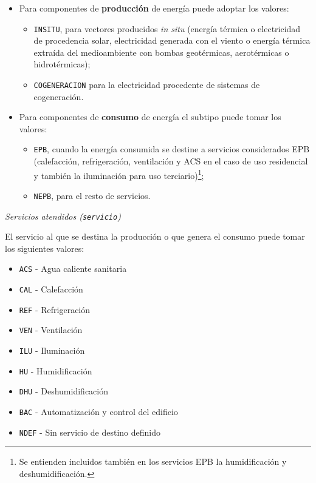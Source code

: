 \documentclass[10pt,notitlepage,oneside,a4paper]{article}
\begin{document}
\begin{itemize}
\item Para componentes de \textbf{producción} de energía puede adoptar los valores:
\begin{itemize}
\item \texttt{INSITU}, para vectores producidos \textit{in situ} (energía térmica o electricidad de procedencia solar, electricidad generada con el viento o energía térmica extraída del medioambiente con bombas geotérmicas, aerotérmicas o hidrotérmicas);
\item \texttt{COGENERACION} para la electricidad procedente de sistemas de cogeneración.
\end{itemize} 

\item Para componentes de \textbf{consumo} de energía el subtipo puede tomar los valores:

\begin{itemize}
\item \texttt{EPB}, cuando la energía consumida se destine a servicios considerados EPB (calefacción, refrigeración, ventilación y ACS en el caso de uso residencial y también la iluminación para uso terciario)\footnote{Se entienden incluidos también en los servicios EPB la humidificación y deshumidificación.};
\item \texttt{NEPB}, para el resto de servicios.
\end{itemize}

\end{itemize}

\textit{Servicios atendidos (\texttt{servicio})}

El servicio al que se destina la producción o que genera el consumo puede tomar los siguientes valores:

\begin{itemize}
\item \texttt{ACS} - Agua caliente sanitaria
\item \texttt{CAL} - Calefacción
\item \texttt{REF} - Refrigeración
\item \texttt{VEN} - Ventilación
\item \texttt{ILU} - Iluminación
\item \texttt{HU} - Humidificación
\item \texttt{DHU} - Deshumidificación
\item \texttt{BAC} - Automatización y control del edificio
\item \texttt{NDEF} - Sin servicio de destino definido
\end{itemize}
\end{document}

